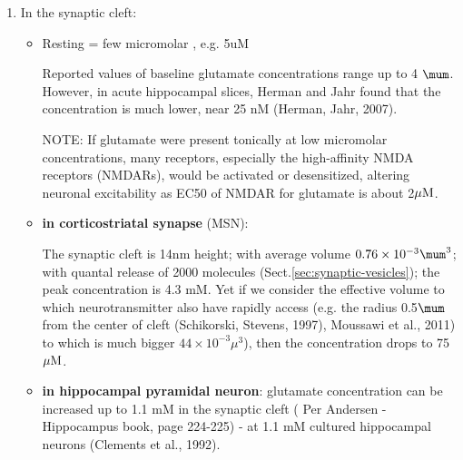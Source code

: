 \begin{enumerate}
  \item In the synaptic cleft:
  \begin{itemize}
     \item Resting = few micromolar , e.g. 5uM
     
     Reported values of baseline glutamate concentrations range up to 4 $\mum$.
     However, in acute hippocampal slices, Herman and Jahr found that the
     concentration is much lower, near 25 nM (Herman, Jahr, 2007). 
     
     NOTE:  If glutamate were present tonically at low micromolar
     concentrations, many receptors, especially the high-affinity NMDA receptors
     (NMDARs), would be activated or desensitized, altering neuronal
     excitability as EC50 of NMDAR for glutamate is about 2${\mu\text{M}}$.
          
     \item {\bf in corticostriatal synapse} (MSN):
     
     
     
     The synaptic cleft is 14nm height; with average volume $0.76 \times 10^{-3}
     \mum^3$; with quantal release of 2000 molecules
     (Sect.\ref{sec:synaptic-vesicles}); the peak concentration is 4.3 mM. Yet
     if we consider the effective volume to which neurotransmitter also have
     rapidly access (e.g. the radius 0.5$\mum$ from the center of cleft
     (Schikorski, Stevens, 1997), Moussawi et al., 2011) to which is much bigger
     $44\times 10^{-3} \mu^3$), then the concentration drops to 75 ${\mu\text{M}}$.
     
     
%      
     
     \item {\bf in hippocampal pyramidal neuron}: glutamate concentration can be
     increased up to 1.1 mM in the synaptic cleft ( Per Andersen - Hippocampus
     book, page 224-225) -   at 1.1 mM cultured hippocampal neurons (Clements et
     al., 1992).
     
     

\end{itemize}
\end{enumerate}

